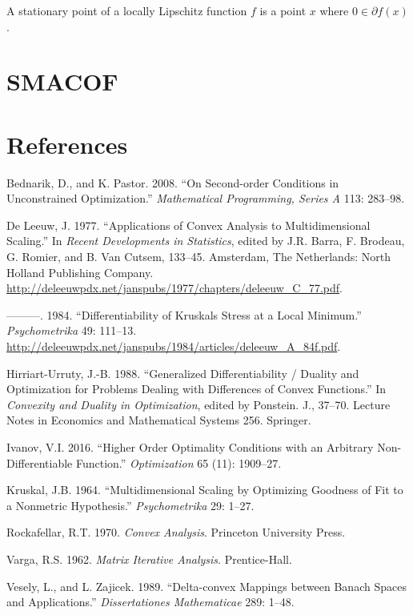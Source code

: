\documentclass[12pt,]{article}
\begin{document}
A stationary point of a locally Lipschitz function \(f\) is a point
\(x\) where \(0\in\partial f(x)\).

\hypertarget{smacof}{%
\section{SMACOF}\label{smacof}}

\hypertarget{references}{%
\section*{References}\label{references}}

\hypertarget{refs}{}
\leavevmode\hypertarget{ref-bednarik_pastor_08}{}%
Bednarik, D., and K. Pastor. 2008. ``On Second-order Conditions in
Unconstrained Optimization.'' \emph{Mathematical Programming, Series A}
113: 283--98.

\leavevmode\hypertarget{ref-deleeuw_C_77}{}%
De Leeuw, J. 1977. ``Applications of Convex Analysis to Multidimensional
Scaling.'' In \emph{Recent Developments in Statistics}, edited by J.R.
Barra, F. Brodeau, G. Romier, and B. Van Cutsem, 133--45. Amsterdam, The
Netherlands: North Holland Publishing Company.
\url{http://deleeuwpdx.net/janspubs/1977/chapters/deleeuw_C_77.pdf}.

\leavevmode\hypertarget{ref-deleeuw_A_84f}{}%
---------. 1984. ``Differentiability of Kruskals Stress at a Local
Minimum.'' \emph{Psychometrika} 49: 111--13.
\url{http://deleeuwpdx.net/janspubs/1984/articles/deleeuw_A_84f.pdf}.

\leavevmode\hypertarget{ref-hirriart-urruty_88}{}%
Hirriart-Urruty, J.-B. 1988. ``Generalized Differentiability / Duality
and Optimization for Problems Dealing with Differences of Convex
Functions.'' In \emph{Convexity and Duality in Optimization}, edited by
Ponstein. J., 37--70. Lecture Notes in Economics and Mathematical
Systems 256. Springer.

\leavevmode\hypertarget{ref-ivanov_16}{}%
Ivanov, V.I. 2016. ``Higher Order Optimality Conditions with an
Arbitrary Non-Differentiable Function.'' \emph{Optimization} 65 (11):
1909--27.

\leavevmode\hypertarget{ref-kruskal_64a}{}%
Kruskal, J.B. 1964. ``Multidimensional Scaling by Optimizing Goodness of
Fit to a Nonmetric Hypothesis.'' \emph{Psychometrika} 29: 1--27.

\leavevmode\hypertarget{ref-rockafellar_70}{}%
Rockafellar, R.T. 1970. \emph{Convex Analysis}. Princeton University
Press.

\leavevmode\hypertarget{ref-varga_62}{}%
Varga, R.S. 1962. \emph{Matrix Iterative Analysis}. Prentice-Hall.

\leavevmode\hypertarget{ref-vesely_zajicek_89}{}%
Vesely, L., and L. Zajicek. 1989. ``Delta-convex Mappings between Banach
Spaces and Applications.'' \emph{Dissertationes Mathematicae} 289:
1--48.
\end{document}
